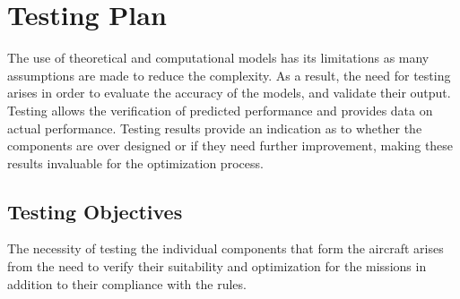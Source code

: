 \section{Testing Plan}

The use of theoretical and computational models has its limitations as many assumptions are made to reduce the complexity. As a result, the need for testing arises in order to evaluate the accuracy of the models, and validate their output. Testing allows the verification of predicted performance and provides data on actual performance. Testing results provide an indication as to whether the components are over designed or if they need further improvement, making these results invaluable for the optimization process.

\subsection{Testing Objectives}

The necessity of testing the individual components that form the aircraft arises from the need to verify their suitability and optimization for the missions in addition to their compliance with the rules. 

